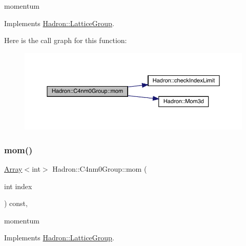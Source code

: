 momentum 

Implements \mbox{\hyperlink{structHadron_1_1LatticeGroup_ad577b65041dd9a6e84b1f3bd49cb8fce}{Hadron\+::\+Lattice\+Group}}.

Here is the call graph for this function\+:
\nopagebreak
\begin{figure}[H]
\begin{center}
\leavevmode
\includegraphics[width=350pt]{da/da1/structHadron_1_1C4nm0Group_a45599b94fa4633619247f4827e03ca23_cgraph}
\end{center}
\end{figure}
\mbox{\label{structHadron_1_1C4nm0Group_a45599b94fa4633619247f4827e03ca23}} 
\subsubsection{\texorpdfstring{mom()}{mom()}\hspace{0.1cm}{\footnotesize\ttfamily [3/3]}}
{\footnotesize\ttfamily \mbox{\hyperlink{classXMLArray_1_1Array}{Array}}$<$int$>$ Hadron\+::\+C4nm0\+Group\+::mom (\begin{DoxyParamCaption}\item[{int}]{index }\end{DoxyParamCaption}) const\hspace{0.3cm}{\ttfamily [inline]}, {\ttfamily [virtual]}}

momentum 

Implements \mbox{\hyperlink{structHadron_1_1LatticeGroup_ad577b65041dd9a6e84b1f3bd49cb8fce}{Hadron\+::\+Lattice\+Group}}.

